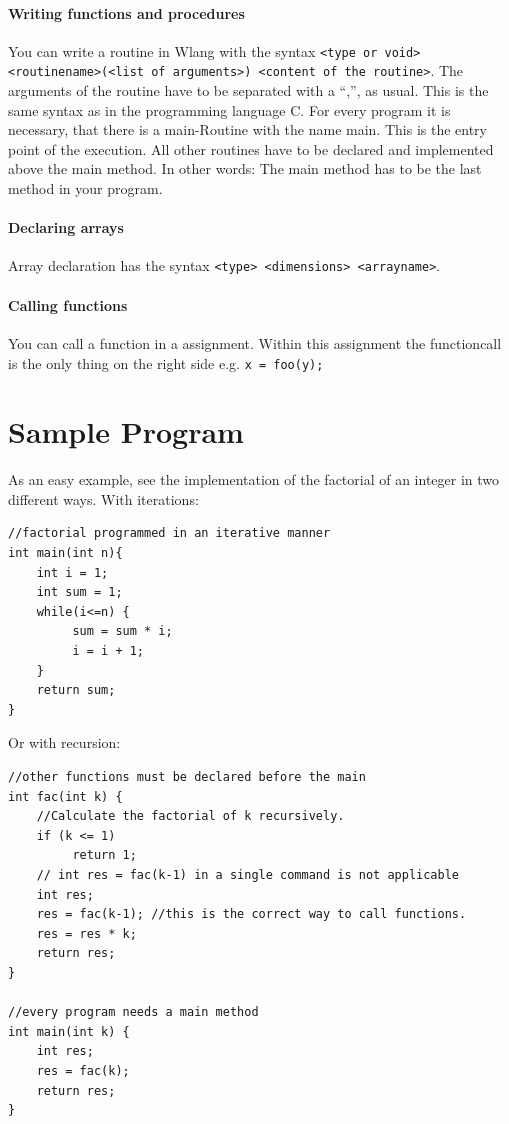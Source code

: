 \documentclass[parskip=full]{memoir}
\begin{document}
\paragraph{Writing functions and procedures}
You can write a routine in Wlang with the syntax \texttt{<type or void> <routinename>(<list of arguments>) <content of the routine>}.
The arguments of the routine have to be separated with a \enquote{,}, as usual. This is the same syntax as in the programming language C. For every program it is necessary, that there is a main-Routine with the name main. This is the entry point of the execution. All other routines have to be declared and implemented above the main method. In other words: The main method has to be the last method in your program.
\paragraph{Declaring arrays}
Array declaration has the syntax \texttt{<type> <dimensions> <arrayname>}. 
\paragraph{Calling functions}
You can call a function in a assignment. Within this assignment the functioncall is the only thing on the right side e.g. \texttt{x = foo(y);}
\section{Sample Program}
As an easy example, see the implementation of the factorial of an integer in two different ways.
With iterations:
\begin{verbatim}
//factorial programmed in an iterative manner
int main(int n){
    int i = 1;
    int sum = 1;
    while(i<=n) {
         sum = sum * i;
         i = i + 1;
    }
    return sum;
}
\end{verbatim}

Or with recursion:

\begin{verbatim}
//other functions must be declared before the main
int fac(int k) {
    //Calculate the factorial of k recursively.
    if (k <= 1)
         return 1;
    // int res = fac(k-1) in a single command is not applicable
    int res;
    res = fac(k-1); //this is the correct way to call functions.
    res = res * k;
    return res;
}

//every program needs a main method
int main(int k) {
    int res;
    res = fac(k);
    return res;
}
\end{verbatim}
\end{document}
